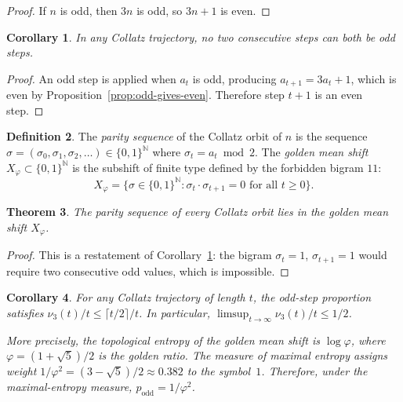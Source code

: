 \documentclass[manuscript]{aomart}
\newcommand{\N}{\mathbb{N}}
\theoremstyle{plain}
\newtheorem{theorem}{Theorem}[section]
\newtheorem{corollary}[theorem]{Corollary}
\theoremstyle{definition}
\newtheorem{definition}[theorem]{Definition}
\theoremstyle{remark}
\numberwithin{equation}{section}
\begin{document}
\begin{proof}
If $n$ is odd, then $3n$ is odd, so $3n + 1$ is even.
\end{proof}

\begin{corollary}\label{cor:no-11}
In any Collatz trajectory, no two consecutive steps can both be odd
steps.
\end{corollary}

\begin{proof}
An odd step is applied when $a_t$ is odd, producing
$a_{t+1} = 3a_t + 1$, which is even by
Proposition~\ref{prop:odd-gives-even}.  Therefore step $t{+}1$ is an
even step.
\end{proof}

\begin{definition}\label{def:parity-seq}
The \emph{parity sequence} of the Collatz orbit of $n$ is the
sequence $\sigma = (\sigma_0, \sigma_1, \sigma_2, \ldots) \in
\{0,1\}^{\N}$ where $\sigma_t = a_t \bmod 2$.  The \emph{golden mean
shift} $X_\varphi \subset \{0,1\}^{\N}$ is the subshift of finite
type defined by the forbidden bigram $11$:
\[
  X_\varphi = \bigl\{ \sigma \in \{0,1\}^{\N} :
  \sigma_t \cdot \sigma_{t+1} = 0 \text{ for all } t \ge 0 \bigr\}.
\]
\end{definition}

\begin{theorem}\label{thm:collatz-sft}
The parity sequence of every Collatz orbit lies in the golden mean
shift $X_\varphi$.
\end{theorem}

\begin{proof}
This is a restatement of Corollary~\ref{cor:no-11}: the bigram
$\sigma_t = 1$, $\sigma_{t+1} = 1$ would require two consecutive odd
values, which is impossible.
\end{proof}

\begin{corollary}\label{cor:p-odd-bound}
For any Collatz trajectory of length $t$, the odd-step proportion
satisfies $\nu_3(t)/t \le \lceil t/2 \rceil / t$.  In particular,
$\limsup_{t \to \infty} \nu_3(t)/t \le 1/2$.

More precisely, the topological entropy of the golden mean shift is
$\log \varphi$, where $\varphi = (1+\sqrt{5})/2$ is the golden
ratio.  The measure of maximal entropy assigns weight
$1/\varphi^2 = (3-\sqrt{5})/2 \approx 0.382$ to the symbol~$1$.
Therefore, under the maximal-entropy measure,
$p_{\mathrm{odd}} = 1/\varphi^2$.
\end{corollary}
\end{document}
